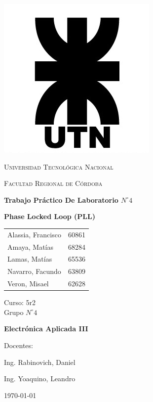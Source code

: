 \documentclass[twocolumn]{article}
\begin{document}
\begin{titlepage}
 \centering
	\includegraphics[scale=0.80]{imagenes/LOGO.jpg} \par
 	\vspace{1cm}
 	{\scshape\LARGE Universidad Tecnológica Nacional \par}
 	{\scshape\large Facultad Regional de Córdoba \par}
 	\vspace{1cm}
	{\bfseries \Large Trabajo Práctico De Laboratorio $N^{\circ} 4$\par}
	{\bfseries \Large Phase Locked Loop (PLL)\par}
 	\vspace{1.5cm}

	\begin{tabular}{ll}
		Alassia, Francisco	&	60861	\\
		Amaya, Matías		&	68284	\\
		Lamas, Matías 		&	65536 	\\
		Navarro, Facundo 	&	63809 	\\
		Veron, Misael	 	&	62628
	\end{tabular}
	
	\vspace{1cm}
	Curso: 5r2 \\
	Grupo $N^{\circ} 4$
 	\vfill
	{\bfseries \Large Electrónica Aplicada III \par}

	\vspace{1.5cm}
	Docentes: \par
	Ing. Rabinovich, Daniel \par
	Ing. Yoaquino, Leandro \par

 	\vfill
	{\large \today\par}
\end{titlepage}
\end{document}

